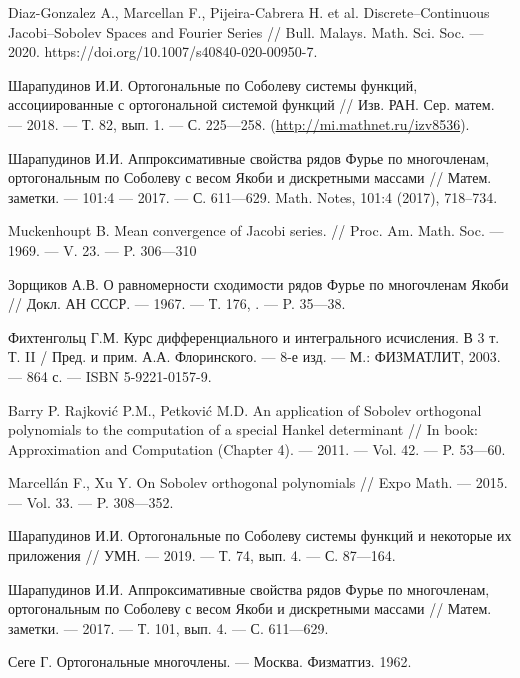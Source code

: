 \begin{thebibliography}{111}
Diaz-Gonzalez A., Marcellan F., Pijeira-Cabrera H. et al.
Discrete--Continuous Jacobi--Sobolev Spaces and Fourier Series
//
Bull. Malays. Math. Sci. Soc.
--- 2020. https://doi.org/10.1007/s40840-020-00950-7.

Шарапудинов И.И.
Ортогональные по Соболеву системы функций, ассоциированные с ортогональной системой функций
//
Изв. РАН. Сер. матем.
--- 2018.
--- Т. 82, вып. 1.
--- С. 225---258. (\url{http://mi.mathnet.ru/izv8536}).

Шарапудинов И.И.
Аппроксимативные свойства рядов Фурье по многочленам, ортогональным по Соболеву с весом Якоби и дискретными массами
//
Матем. заметки.
--- 101:4
--- 2017.
--- С. 611---629.
Math. Notes, 101:4 (2017), 718–734.

Muckenhoupt B.
Mean convergence of Jacobi series.
//
Proc. Am. Math. Soc.
--- 1969.
--- V. 23.
--- P. 306---310

Зорщиков А.В.
О равномерности сходимости рядов Фурье по многочленам Якоби
//
Докл. АН СССР.
--- 1967.
--- Т. 176, .
--- P. 35---38.

Фихтенгольц Г.М.
Курс дифференциального и интегрального исчисления. В 3 т. Т. II / Пред. и прим. А.А. Флоринского.
--- 8-е изд.
--- М.: ФИЗМАТЛИТ, 2003.
--- 864 с.
--- ISBN 5-9221-0157-9.



{Barry P. Rajkovi\'c P.M., Petkovi\'c M.D.}
An application of Sobolev orthogonal polynomials to the computation of a special Hankel determinant
//
In book: Approximation and Computation (Chapter 4).
--- 2011.
--- Vol. 42.
--- P. 53---60.

{Marcell\'an F., Xu Y.}
On Sobolev orthogonal polynomials
//
Expo Math.
--- 2015.
--- Vol. 33.
--- P. 308---352.

{Шарапудинов И.И.}
Ортогональные по Соболеву системы функций и некоторые их приложения
//
УМН.
--- 2019.
--- Т. 74, вып. 4.
--- С. 87---164.

{Шарапудинов И.И.}
Аппроксимативные свойства рядов Фурье по многочленам, ортогональным по Соболеву с весом Якоби и дискретными массами
//
Матем. заметки.
--- 2017.
--- Т. 101, вып. 4.
--- С. 611---629.	

{Сеге Г.}
Ортогональные многочлены.
--- Москва. Физматгиз. 1962.


\end{thebibliography}
